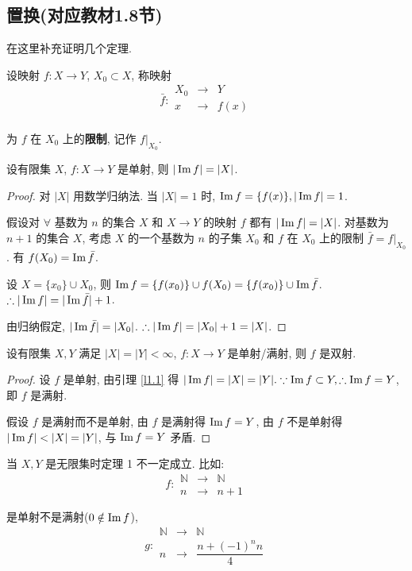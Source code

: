 \documentclass[color=black,device=normal,lang=cn,mode=geye]{elegantnote}
\begin{document}
\subsection{置换(对应教材1.8节)}
在这里补充证明几个定理.
\begin{definition}
    设映射 $f:X\to Y$, $X_0\subset X$, 称映射
    \[\bar{f}:\begin{array}{rcl}
        X_0 & \to & Y \\
        x & \to & f(x) \\
    \end{array}\]

    为 $f$ 在 $X_0$ 上的\textbf{限制}, 记作 $f|_{X_0}$.
\end{definition}
\begin{lemma}\label{l1.1}
    设有限集 $X$, $f:X\to Y$ 是单射, 则 $|\operatorname{Im} f|=|X|$.
\end{lemma}
\begin{proof}
    对 $|X|$ 用数学归纳法. 当 $|X|=1$ 时, $\operatorname{Im} f=\{f(x)\},|\operatorname{Im} f|=1$.

    假设对 $\forall$ 基数为 $n$ 的集合 $X$ 和 $X\to Y$ 的映射 $f$ 都有 $|\operatorname{Im} f|=|X|$. 对基数为 $n+1$ 的集合 $X$, 考虑 $X$ 的一个基数为 $n$ 的子集 $X_0$ 和 $f$ 在 $X_0$ 上的限制 $\bar{f}=f|_{X_0}$. 有 $f(X_0)=\operatorname{Im} \bar{f}$.

    设 $X=\{x_0\}\cup X_0$, 则 $\operatorname{Im} f=\{f(x_0)\}\cup f(X_0)=\{f(x_0)\}\cup\operatorname{Im} \bar{f}$. $\therefore|\operatorname{Im} f|=|\operatorname{Im} \bar{f}|+1$.

    由归纳假定, $|\operatorname{Im} \bar{f}|=|X_0|$. $\therefore|\operatorname{Im} f|=|X_0|+1=|X|$.
\end{proof}
\begin{theorem}
    设有限集 $X,Y$ 满足 $|X|=|Y|<\infty$, $f:X\to Y$ 是单射/满射, 则 $f$ 是双射.
\end{theorem}
\begin{proof}
    设 $f$ 是单射, 由引理 \ref{l1.1} 得 $|\operatorname{Im} f|=|X|=|Y|.\because\operatorname{Im} f\subset Y,\therefore\operatorname{Im} f=Y$, 即 $f$ 是满射.

    假设 $f$ 是满射而不是单射, 由 $f$ 是满射得 $\operatorname{Im} f=Y$, 由 $f$ 不是单射得 $|\im f|<|X|=|Y|$, 与 $\operatorname{Im} f=Y$ 矛盾.
\end{proof}

当 $X,Y$ 是无限集时定理 1 不一定成立. 比如:
\[f:\begin{array}{rcl}
\mathbb{N} & \to & \mathbb{N} \\
n & \to & n+1
\end{array}\]

是单射不是满射($0\notin\operatorname{Im} f$),
\[g:\begin{array}{rcl}
\mathbb{N} & \to & \mathbb{N} \\
n & \to & \dfrac{n+(-1)^nn}{4}
\end{array}\]
\end{document}
